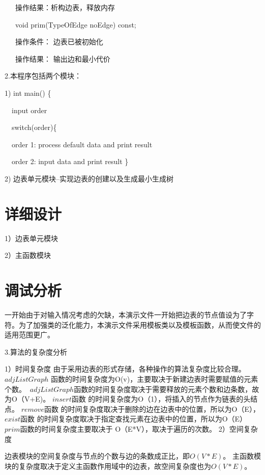 \documentclass[paper=a4,UTF8,fontsize=11pt]{scrartcl} %
\numberwithin{equation}{section} %
\numberwithin{figure}{section} %
\numberwithin{table}{section} %
\begin{document}
\qquad \qquad \quad \ \ \ 操作结果：析构边表，释放内存

\qquad \qquad \quad \ \ \ void prim(TypeOfEdge noEdge) const;

\qquad \qquad \quad \ \ \ 操作条件： 边表已被初始化

\qquad \qquad \quad \ \ \ 操作结果： 输出边和最小代价

\vspace{0.3cm}

2.本程序包括两个模块：

1)  int main() \{
	
	\ \ input order

    \ \  switch(order)\{
			
		\ \ 	 order 1: process default data and print result
		
		\ \  order 2: input data and print result
\}
       
2)  边表单元模块--实现边表的创建以及生成最小生成树

\section{详细设计}
1）边表单元模块


2）主函数模块


\vspace{0.3cm}
\section{调试分析}
一开始由于对输入情况考虑的欠缺，本演示文件一开始把边表的节点值设为了字符。为了加强类的泛化能力，本演示文件采用模板类以及模板函数，从而使文件的适用范围更广。

3.算法的复杂度分析

1）时间复杂度
由于采用边表的形式存储，各种操作的算法复杂度比较合理。
$adjListGraph$ 函数的时间复杂度为O(v)，主要取决于新建边表时需要赋值的元素个数。
$~adjListGraph$函数的时间复杂度取决于需要释放的元素个数和边条数，故为O（V+E)。
$insert$函数	的时间复杂度为O（1），将插入的节点作为链表的头结点。
$remove$函数	的时间复杂度取决于删除的边在边表中的位置，所以为O（E），
$exist$函数	的时间复杂度取决于指定查找元素在边表中的位置，所以为O（E）
$prim$函数的时间复杂度主要取决于  O（E*V），取决于遍历的次数。
2）空间复杂度

边表模块的空间复杂度与节点的个数与边的条数成正比，即$O(V*E)$。
主函数模块的复杂度取决于定义主函数作用域中的边表，故空间复杂度也为$O(V*E)$。
\vspace{0.5cm}
\end{document}
